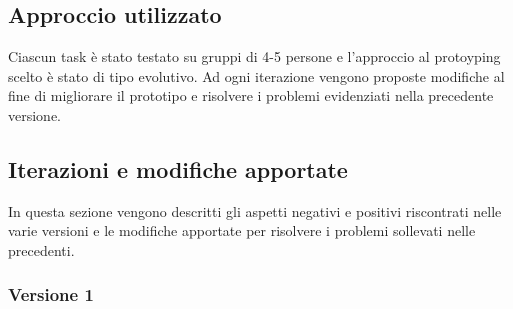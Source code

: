 \subsection{Approccio utilizzato}

Ciascun task è stato testato su gruppi di 4-5 persone e l'approccio al protoyping scelto è stato di tipo evolutivo. Ad ogni iterazione vengono proposte modifiche al fine di migliorare il prototipo e risolvere i problemi evidenziati nella precedente versione.

\clearpage


\subsection{Iterazioni e modifiche apportate}

In questa sezione vengono descritti gli aspetti negativi e positivi riscontrati nelle varie versioni e le modifiche apportate per risolvere i problemi sollevati nelle precedenti.
\subsubsection{Versione 1}

